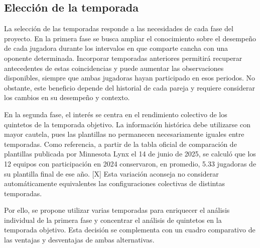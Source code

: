 \subsection{Elección de la temporada}
La selección de las temporadas responde a las necesidades de cada fase del proyecto. En la primera fase se busca ampliar el conocimiento sobre el desempeño de cada jugadora durante los intervalos en que comparte cancha con una oponente determinada. Incorporar temporadas anteriores permitirá recuperar antecedentes de estas coincidencias y puede aumentar las observaciones disponibles, siempre que ambas jugadoras hayan participado en esos periodos. No obstante, este beneficio depende del historial de cada pareja y requiere considerar los cambios en su desempeño y contexto.

En la segunda fase, el interés se centra en el rendimiento colectivo de los quintetos de la temporada objetivo. La información histórica debe utilizarse con mayor cautela, pues las plantillas no permanecen necesariamente iguales entre temporadas. Como referencia, a partir de la tabla oficial de comparación de plantillas publicada por Minnesota Lynx el 14 de junio de 2025, se calculó que los 12 equipos con participación en 2024 conservaron, en promedio, 5.33 jugadoras de su plantilla final de ese año. [X] Esta variación aconseja no considerar automáticamente equivalentes las configuraciones colectivas de distintas temporadas.

Por ello, se propone utilizar varias temporadas para enriquecer el análisis individual de la primera fase y concentrar el análisis de quintetos en la temporada objetivo. Esta decisión se complementa con un cuadro comparativo de las ventajas y desventajas de ambas alternativas.


